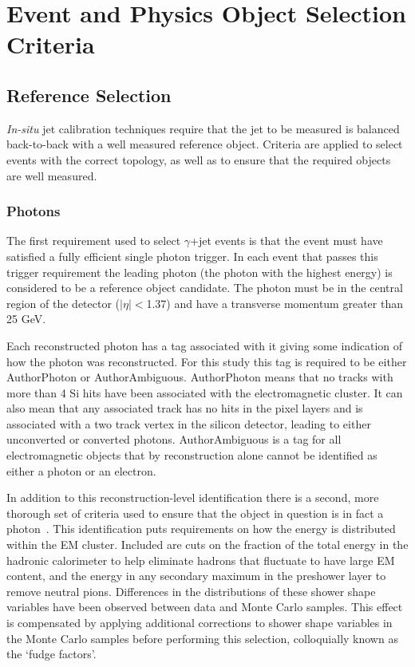 \section{Event and Physics Object Selection Criteria}
\label{Sec:SelectionCriteria}
\subsection{Reference Selection}
{\textit{In-situ}} jet calibration techniques require that the jet to be measured is balanced back-to-back with a well measured reference object.  
Criteria are applied to select events with the correct topology, as well as to ensure that the required objects are well measured.  

\subsubsection{Photons}
\label{Sec:Photons}
The first requirement used to select $\gamma$+jet events is that the event must have satisfied a fully efficient single photon trigger.  
In each event that passes this trigger requirement the leading photon (the photon with the highest energy) is considered to be a reference object candidate.  
The photon must be in the central region of the detector ($\mid\eta\mid<$1.37) and have a transverse momentum greater than 25 GeV.  

Each reconstructed photon has a tag associated with it giving some indication of how the photon was reconstructed.  
For this study this tag is required to be either AuthorPhoton or AuthorAmbiguous.  
AuthorPhoton means that no tracks with more than 4 Si hits have been associated with the electromagnetic cluster.  
It can also mean that any associated track has no hits in the pixel layers and is associated with a two track vertex in the silicon detector, leading to either unconverted or converted photons.  
AuthorAmbiguous is a tag for all electromagnetic objects that by reconstruction alone cannot be identified as either a photon or an electron.  

In addition to this reconstruction-level identification there is a second, more thorough set of criteria used to ensure that the object in question is in fact a photon~\cite{ATL-PHYS-PUB-2016-014}.  
This identification puts requirements on how the energy is distributed within the EM cluster.  
Included are cuts on the fraction of the total energy in the hadronic calorimeter to help eliminate hadrons that fluctuate to have large EM content, and the energy in any secondary maximum in the preshower layer to remove neutral pions.  
Differences in the distributions of these shower shape variables have been observed between data and Monte Carlo samples.  
This effect is compensated by applying additional corrections to shower shape variables in the Monte Carlo samples before performing this selection, colloquially known as the `fudge factors'.  

